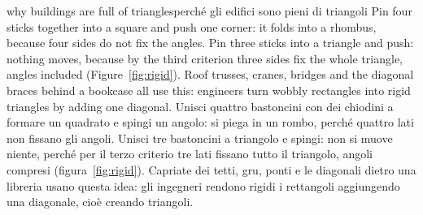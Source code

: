 \documentclass[10pt,a4paper,oneside]{book}
\begin{document}
\begin{example}{why buildings are full of triangles}{perché gli edifici sono pieni di triangoli}
Pin four sticks together into a square and push one corner: it folds into a rhombus, because four sides do not fix the angles. Pin three sticks into a triangle and push: nothing moves, because by the third criterion three sides fix the whole triangle, angles included (Figure~\ref{fig:rigid}). Roof trusses, cranes, bridges and the diagonal braces behind a bookcase all use this: engineers turn wobbly rectangles into rigid triangles by adding one diagonal.
\tcblower
Unisci quattro bastoncini con dei chiodini a formare un quadrato e spingi un angolo: si piega in un rombo, perché quattro lati non fissano gli angoli. Unisci tre bastoncini a triangolo e spingi: non si muove niente, perché per il terzo criterio tre lati fissano tutto il triangolo, angoli compresi (figura~\ref{fig:rigid}). Capriate dei tetti, gru, ponti e le diagonali dietro una libreria usano questa idea: gli ingegneri rendono rigidi i rettangoli aggiungendo una diagonale, cioè creando triangoli.
\end{example}
\end{document}
